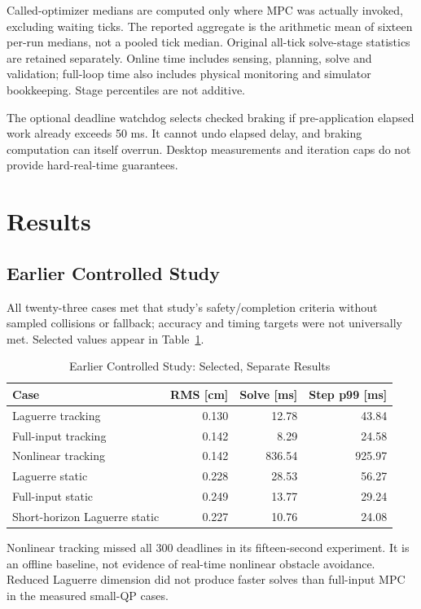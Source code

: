 \documentclass[conference]{IEEEtran}
\begin{document}
Called-optimizer medians are computed only where MPC was actually invoked,
excluding waiting ticks. The reported aggregate is the arithmetic mean of
sixteen per-run medians, not a pooled tick median. Original all-tick solve-stage
statistics are retained separately. Online time includes sensing, planning,
solve and validation; full-loop time also includes physical monitoring and
simulator bookkeeping. Stage percentiles are not additive.

The optional deadline watchdog selects checked braking if pre-application
elapsed work already exceeds 50 ms. It cannot undo elapsed delay, and
braking computation can itself overrun. Desktop measurements and iteration
caps do not provide hard-real-time guarantees.

\section{Results}
\subsection{Earlier Controlled Study}
All twenty-three cases met that study's safety/completion criteria without
sampled collisions or fallback; accuracy and timing targets were not universally
met. Selected values appear in Table~\ref{tab:earlier}.

\begin{table}[t]
\caption{Earlier Controlled Study: Selected, Separate Results}
\label{tab:earlier}
\centering
\footnotesize
\setlength{\tabcolsep}{4pt}
\begin{tabular}{lrrr}
\toprule
Case & RMS [cm] & Solve [ms] & Step p99 [ms]\\
\midrule
Laguerre tracking & 0.130 & 12.78 & 43.84\\
Full-input tracking & 0.142 & 8.29 & 24.58\\
Nonlinear tracking & 0.142 & 836.54 & 925.97\\
Laguerre static & 0.228 & 28.53 & 56.27\\
Full-input static & 0.249 & 13.77 & 29.24\\
Short-horizon Laguerre static & 0.227 & 10.76 & 24.08\\
\bottomrule
\end{tabular}
\end{table}

Nonlinear tracking missed all 300 deadlines in its fifteen-second experiment.
It is an offline baseline, not evidence of real-time nonlinear obstacle
avoidance. Reduced Laguerre dimension did not produce faster solves than
full-input MPC in the measured small-QP cases.
\end{document}
